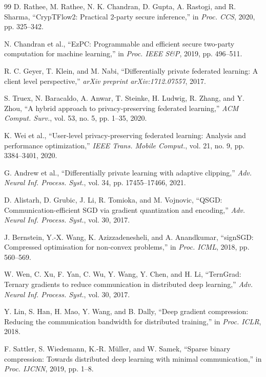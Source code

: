 \begin{thebibliography}{99}
D. Rathee, M. Rathee, N. K. Chandran, D. Gupta, A. Rastogi, and R. Sharma, ``CrypTFlow2: Practical 2-party secure inference,'' in \textit{Proc. CCS}, 2020, pp. 325--342.

N. Chandran et al., ``EzPC: Programmable and efficient secure two-party computation for machine learning,'' in \textit{Proc. IEEE S\&P}, 2019, pp. 496--511.

R. C. Geyer, T. Klein, and M. Nabi, ``Differentially private federated learning: A client level perspective,'' \textit{arXiv preprint arXiv:1712.07557}, 2017.

S. Truex, N. Baracaldo, A. Anwar, T. Steinke, H. Ludwig, R. Zhang, and Y. Zhou, ``A hybrid approach to privacy-preserving federated learning,'' \textit{ACM Comput. Surv.}, vol. 53, no. 5, pp. 1--35, 2020.

K. Wei et al., ``User-level privacy-preserving federated learning: Analysis and performance optimization,'' \textit{IEEE Trans. Mobile Comput.}, vol. 21, no. 9, pp. 3384--3401, 2020.

G. Andrew et al., ``Differentially private learning with adaptive clipping,'' \textit{Adv. Neural Inf. Process. Syst.}, vol. 34, pp. 17455--17466, 2021.

D. Alistarh, D. Grubic, J. Li, R. Tomioka, and M. Vojnovic, ``QSGD: Communication-efficient SGD via gradient quantization and encoding,'' \textit{Adv. Neural Inf. Process. Syst.}, vol. 30, 2017.

J. Bernstein, Y.-X. Wang, K. Azizzadenesheli, and A. Anandkumar, ``signSGD: Compressed optimisation for non-convex problems,'' in \textit{Proc. ICML}, 2018, pp. 560--569.

W. Wen, C. Xu, F. Yan, C. Wu, Y. Wang, Y. Chen, and H. Li, ``TernGrad: Ternary gradients to reduce communication in distributed deep learning,'' \textit{Adv. Neural Inf. Process. Syst.}, vol. 30, 2017.

Y. Lin, S. Han, H. Mao, Y. Wang, and B. Dally, ``Deep gradient compression: Reducing the communication bandwidth for distributed training,'' in \textit{Proc. ICLR}, 2018.

F. Sattler, S. Wiedemann, K.-R. M\"{u}ller, and W. Samek, ``Sparse binary compression: Towards distributed deep learning with minimal communication,'' in \textit{Proc. IJCNN}, 2019, pp. 1--8.


\end{thebibliography}
